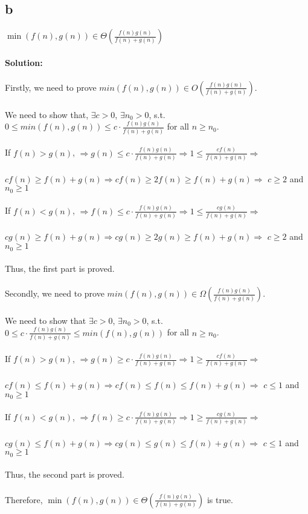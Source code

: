 \documentclass[12pt]{article}
\begin{document}
\begin{itemize}
\part{b} $\min(f(n),g(n)) \in \Theta\left (\frac{f(n)g(n)}{f(n)+g(n)}\right)$  
\\
\\\textbf{Solution: }
\\
\\Firstly, we need to prove $min(f(n),g(n)) \in O(\frac{f(n)g(n)} {f(n)+g(n)})$.
\\
\\We need to show that, $\exists c > 0$, $\exists n_0 > 0$, s.t. $0 \leq min(f(n), g(n)) \leq c \cdot \frac{f(n)g(n)} {f(n)+g(n)}$ for all $n \geq n_0$.
\\
\\If $f(n) > g(n)$, $\Rightarrow g(n) \leq c \cdot \frac{f(n)g(n)} {f(n)+g(n)} \Rightarrow 1 \leq \frac{cf(n)} {f(n) + g(n)} \Rightarrow$
\\
\\$ cf(n) \geq f(n) + g(n) \Rightarrow cf(n) \geq 2f(n) \geq f(n) + g(n) \Rightarrow$ $c \geq 2$ and $ n_0 \geq 1$
\\
\\If $f(n) < g(n)$, $\Rightarrow f(n) \leq c \cdot \frac{f(n)g(n)} {f(n)+g(n)} \Rightarrow 1 \leq \frac{cg(n)} {f(n) + g(n)} \Rightarrow$
\\
\\$ cg(n) \geq f(n) + g(n) \Rightarrow cg(n) \geq 2g(n) \geq f(n) + g(n) \Rightarrow$ $c \geq 2$ and $ n_0 \geq 1$
\\
\\Thus, the first part is proved.
\\
\\Secondly, we need to prove $min(f(n),g(n)) \in \Omega(\frac{f(n)g(n)} {f(n)+g(n)})$.
\\
\\We need to show that $\exists c > 0$, $\exists n_0 > 0$, s.t. $0 \leq c \cdot \frac{f(n)g(n)} {f(n)+g(n)} \leq min(f(n), g(n))$ for all $n \geq n_0$.
\\
\\If $f(n) > g(n)$, $\Rightarrow g(n) \geq c \cdot \frac{f(n)g(n)} {f(n)+g(n)} \Rightarrow 1 \geq \frac{cf(n)} {f(n) + g(n)} \Rightarrow$
\\
\\$ cf(n) \leq f(n) + g(n) \Rightarrow cf(n) \leq f(n) \leq f(n) + g(n) \Rightarrow$ $c \leq 1$ and $ n_0 \geq 1$
\\
\\If $f(n) < g(n)$, $\Rightarrow f(n) \geq c \cdot \frac{f(n)g(n)} {f(n)+g(n)} \Rightarrow 1 \geq \frac{cg(n)} {f(n) + g(n)} \Rightarrow$
\\
\\$ cg(n) \leq f(n) + g(n) \Rightarrow cg(n) \leq g(n) \leq f(n) + g(n) \Rightarrow$ $c \leq 1$ and $ n_0 \geq 1$
\\
\\Thus, the second part is proved.
\\
\\Therefore, $\min(f(n),g(n)) \in \Theta\left (\frac{f(n)g(n)}{f(n)+g(n)}\right)$ is true.
\end{itemize}
\end{document}
